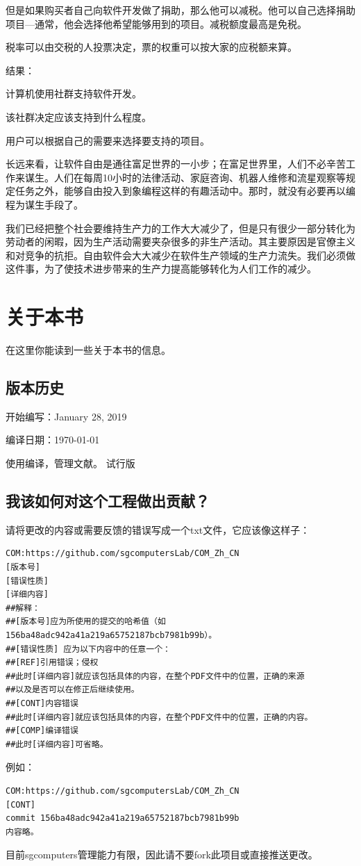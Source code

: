但是如果购买者自己向软件开发做了捐助，那么他可以减税。他可以自己选择捐助项目—通常，他会选择他希望能够用到的项目。减税额度最高是免税。\par
税率可以由交税的人投票决定，票的权重可以按大家的应税额来算。\par
结果：\par
计算机使用社群支持软件开发。\par
该社群决定应该支持到什么程度。\par
用户可以根据自己的需要来选择要支持的项目。\par
长远来看，让软件自由是通往富足世界的一小步；在富足世界里，人们不必辛苦工作来谋生。人们在每周10小时的法律活动、家庭咨询、机器人维修和流星观察等规定任务之外，能够自由投入到象编程这样的有趣活动中。那时，就没有必要再以编程为谋生手段了。\par
我们已经把整个社会要维持生产力的工作大大减少了，但是只有很少一部分转化为劳动者的闲暇，因为生产活动需要夹杂很多的非生产活动。其主要原因是官僚主义和对竞争的抗拒。自由软件会大大减少在软件生产领域的生产力流失。我们必须做这件事，为了使技术进步带来的生产力提高能够转化为人们工作的减少。
\chapter{关于本书}
在这里你能读到一些关于本书的信息。
\section{版本历史}
开始编写：January 28, 2019\par
编译日期：\today \par
使用\XeLaTeX 编译，\BIBTEX 管理文献。
试行版
\section{我该如何对这个工程做出贡献？}
请将更改的内容或需要反馈的错误写成一个txt文件，它应该像这样子：
\begin{verbatim}
COM:https://github.com/sgcomputersLab/COM_Zh_CN
[版本号]
[错误性质]
[详细内容]
##解释：
##[版本号]应为所使用的提交的哈希值（如156ba48adc942a41a219a65752187bcb7981b99b）。
##[错误性质] 应为以下内容中的任意一个：
##[REF]引用错误；侵权
##此时[详细内容]就应该包括具体的内容，在整个PDF文件中的位置，正确的来源
##以及是否可以在修正后继续使用。
##[CONT]内容错误
##此时[详细内容]就应该包括具体的内容，在整个PDF文件中的位置，正确的内容。
##[COMP]编译错误
##此时[详细内容]可省略。
\end{verbatim} \par
例如：
\begin{verbatim}
COM:https://github.com/sgcomputersLab/COM_Zh_CN
[CONT]
commit 156ba48adc942a41a219a65752187bcb7981b99b
内容略。
\end{verbatim} \par
目前sgcomputers管理能力有限，因此请不要fork此项目或直接推送更改。
